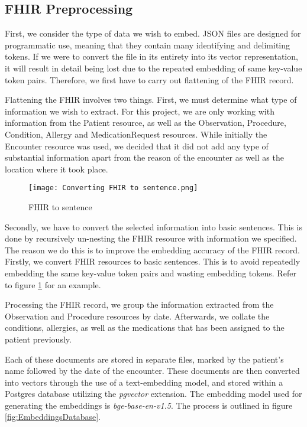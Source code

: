 \subsection{FHIR Preprocessing}

First, we consider the type of data we wish to embed. JSON files are designed for programmatic use, meaning that they contain many identifying and delimiting tokens. If we were to convert the file in its entirety into its vector representation, it will result in detail being lost due to the repeated embedding of same key-value token pairs. Therefore, we first have to carry out flattening of the FHIR record.

Flattening the FHIR involves two things. First, we must determine what type of information we wish to extract. For this project, we are only working with information from the Patient resource, as well as the Observation, Procedure, Condition, Allergy and MedicationRequest resources. While initially the Encounter resource was used, we decided that it did not add any type of substantial information apart from the reason of the encounter as well as the location where it took place.

\begin{figure}
	\texttt{[image: Converting FHIR to sentence.png]}
	\caption{FHIR to sentence}
	\centering
	\label{fig:FHIRtoSentence}
\end{figure}

Secondly, we have to convert the selected information into basic sentences. This is done by recursively un-nesting the FHIR resource with information we specified.
The reason we do this is to improve the embedding accuracy of the FHIR record.
Firstly, we convert FHIR resources to basic sentences.
This is to avoid repeatedly embedding the same key-value token pairs and wasting embedding tokens.
Refer to figure \ref{fig:FHIRtoSentence} for an example.

Processing the FHIR record, we group the information extracted from the Observation and Procedure resources by date. Afterwards, we collate the conditions, allergies, as well as the medications that has been assigned to the patient previously.

Each of these documents are stored in separate files, marked by the patient's name followed by the date of the encounter. These documents are then converted into vectors through the use of a text-embedding model, and stored within a Postgres database utilizing the \textit{pgvector} extension. The embedding model used for generating the embeddings is \emph{bge-base-en-v1.5}. The process is outlined in figure \ref{fig:EmbeddingsDatabase}.


